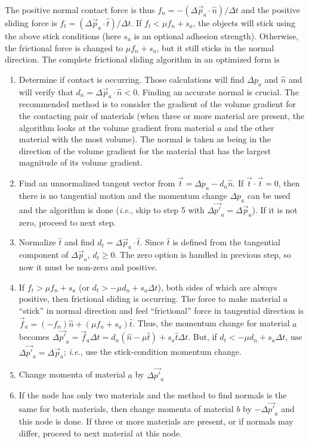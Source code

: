 \documentclass[11pt]{article}
\begin{document}
The positive normal contact force is thus $f_n = -(\Delta \vec p_a\cdot \hat n)/\Delta t$ and the positive sliding force is $f_t = (\Delta \vec p_a\cdot \hat t)/\Delta t$. If $f_t<\mu f_n+s_a$, the objects will stick using the above stick conditions (here $s_a$ is an optional adhesion strength). Otherwise, the frictional force is changed to $\mu f_n+s_a$, but it still sticks in the normal direction. The complete frictional sliding algorithm in an optimized form is
\begin{enumerate}

\item Determine if contact is occurring. Those calculations will find $\Delta p_a$ and $\hat n$ and will verify that $d_n = \Delta \vec p_a\cdot \hat n<0$. Finding an accurate normal is crucial. The recommended method is to consider the gradient of the volume gradient for the contacting pair of materials (when three or more material are present, the algorithm looks at the volume gradient from material $a$ and the other material with the most volume). The normal is taken as being in the direction of the volume gradient for the material that has the largest magnitude of its volume gradient.

\item Find an unnormalized tangent vector from $\vec t = \Delta p_a - d_n\hat n$. If $\vec t\cdot\vec t=0$, then there is no tangential motion and the momentum change $\Delta p_a$ can be used and the algorithm is done ({\em i.e.}, skip to step 5 with $\Delta \vec {p'}_a =\Delta \vec p_a$). If it is not zero, proceed to next step.

\item Normalize $\hat t$ and find $d_t = \Delta \vec p_a\cdot \hat t$. Since $\hat t$ is defined from the tangential component of $\Delta\vec p_a$, $d_t\ge0$. The zero option is handled in previous step, so now it must be non-zero and positive.

\item If $f_t > \mu f_n+s_a$ (or $d_t>-\mu d_n+s_a\Delta t$), both sides of which are always positive, then frictional sliding is occurring. The force to make material $a$ ``stick'' in normal direction and feel ``frictional'' force in tangential direction is $\vec f_a = (-f_n)\hat n + (\mu f_n+s_a)\hat t$. Thus,  the momentum change for material $a$ becomes $\Delta \vec {p'}_a = \vec f_a\Delta t = d_n(\hat n - \mu\hat t)+s_a\hat t\Delta t $. But, if $d_t<-\mu d_n+s_a\Delta t$, use $\Delta \vec {p'}_a =\Delta \vec p_a$; {\em i.e.}, use the stick-condition momentum change.

\item Change momenta of material $a$ by $\Delta\vec {p'}_a$

\item If the node has only two materials and the method to find normals is the same for both materials, then change momenta of material $b$ by $-\Delta\vec {p'}_a$ and this node is done. If three or more materials are present, or if normals may differ, proceed to next material at this node.

\end {enumerate}
\end{document}
